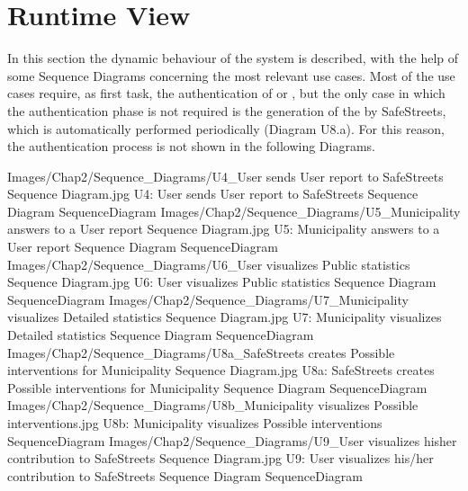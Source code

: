\documentclass[../../DD.tex]{subfiles}
\begin{document}
\section{Runtime View\label{sect:2.4}}

In this section the dynamic behaviour of the system is described, with the help of some Sequence Diagrams concerning the most relevant use cases.
Most of the use cases require, as first task, the authentication of  or , but the only case in which the authentication phase is not required is the generation of the  by SafeStreets, which is automatically performed periodically (Diagram U8.a). For this reason, the authentication process is not shown in the following Diagrams.

\image {10cm} {Images/Chap2/Sequence_Diagrams/U4_User sends User report to SafeStreets Sequence Diagram.jpg} {U4: User sends User report to SafeStreets Sequence Diagram} {SequenceDiagram}
\image {8cm} {Images/Chap2/Sequence_Diagrams/U5_Municipality answers to a User report Sequence Diagram.jpg} {U5: Municipality answers to a User report Sequence Diagram} {SequenceDiagram}
\image {8cm} {Images/Chap2/Sequence_Diagrams/U6_User visualizes Public statistics Sequence Diagram.jpg} {U6: User visualizes Public statistics Sequence Diagram} {SequenceDiagram}
\image {12cm} {Images/Chap2/Sequence_Diagrams/U7_Municipality visualizes Detailed statistics Sequence Diagram.jpg} {U7: Municipality visualizes Detailed statistics Sequence Diagram} {SequenceDiagram}
\image {10cm} {Images/Chap2/Sequence_Diagrams/U8a_SafeStreets creates Possible interventions for Municipality Sequence Diagram.jpg} {U8a: SafeStreets creates Possible interventions for Municipality Sequence Diagram} {SequenceDiagram}
\image {4cm} {Images/Chap2/Sequence_Diagrams/U8b_Municipality visualizes Possible interventions.jpg} {U8b: Municipality visualizes Possible interventions} {SequenceDiagram}
\image {8cm} {Images/Chap2/Sequence_Diagrams/U9_User visualizes hisher contribution to SafeStreets Sequence Diagram.jpg} {U9: User visualizes his/her contribution to SafeStreets Sequence Diagram} {SequenceDiagram}

\newpage
\end{document}
